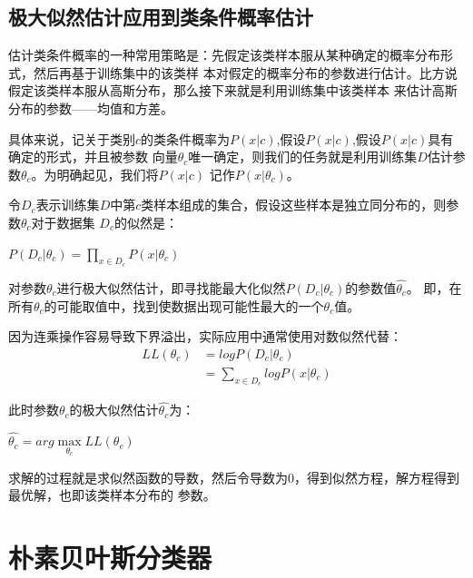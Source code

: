 \documentclass[UTF8]{ctexart}
\begin{document}
{\subsection{极大似然估计应用到类条件概率估计}
估计类条件概率的一种常用策略是：先假定该类样本服从某种确定的概率分布形式，然后再基于训练集中的该类样
本对假定的概率分布的参数进行估计。比方说假定该类样本服从高斯分布，那么接下来就是利用训练集中该类样本
来估计高斯分布的参数——均值和方差。\par
具体来说，记关于类别$c$的类条件概率为$P(x|c)$,假设$P(x|c)$,假设$P(x|c)$具有确定的形式，并且被参数
向量$\theta_c$唯一确定，则我们的任务就是利用训练集$D$估计参数$\theta_c$。为明确起见，我们将$P(x|c)$
记作$P(x|\theta_c)$。\par
令$D_c$表示训练集$D$中第$c$类样本组成的集合，假设这些样本是独立同分布的，则参数$\theta_c$对于数据集
$D_c$的似然是：
\begin{center}
    \Large{
        $P(D_c|\theta_c)=\prod\limits_{x\in D_c}P(x|\theta_c)$
    }
\end{center}
对参数$\theta_c$进行极大似然估计，即寻找能最大化似然$P(D_c|\theta_c)$的参数值$\hat{\theta_c}$。
即，在所有$\theta_c$的可能取值中，找到使数据出现可能性最大的一个$\theta_c$值。\par
因为连乘操作容易导致下界溢出，实际应用中通常使用对数似然代替：
\Large{
    \begin{align*}
        LL(\theta_c)&=logP(D_c|\theta_c)\\[2ex]
                    &=\sum\limits_{x\in D_c}logP(x|\theta_c)
    \end{align*}
}\par
此时参数$\theta_c$的极大似然估计$\hat{\theta_c}$为：
\begin{center}
    \LARGE{
        $\hat{\theta_c}=arg\max\limits_{\theta_c}LL(\theta_c)$
    }
\end{center}\par
求解的过程就是求似然函数的导数，然后令导数为0，得到似然方程，解方程得到最优解，也即该类样本分布的
参数。\newpage
\section{朴素贝叶斯分类器}
}
\end{document}
